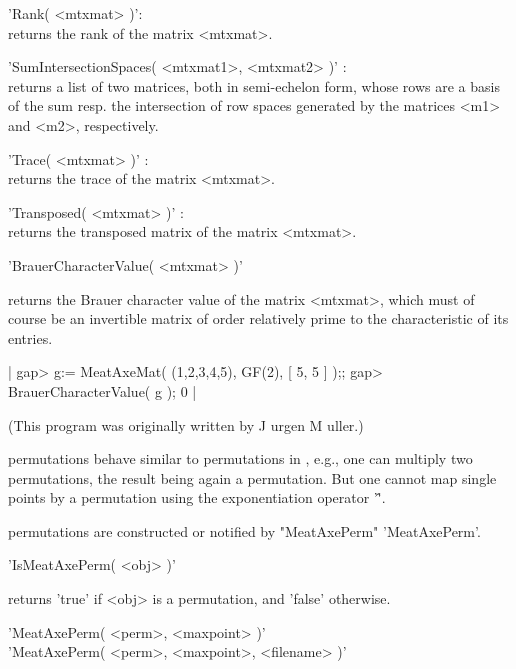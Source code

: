'Rank( <mtxmat> )': \\
     returns the rank of the {\MeatAxe} matrix <mtxmat>.

'SumIntersectionSpaces( <mtxmat1>, <mtxmat2> )' : \\
     returns a list of two {\MeatAxe} matrices, both in semi-echelon form,
     whose rows are a basis of the sum resp. the intersection of row spaces
     generated by the {\MeatAxe} matrices <m1> and <m2>, respectively.

'Trace( <mtxmat> )' : \\
     returns the trace of the {\MeatAxe} matrix <mtxmat>.

'Transposed( <mtxmat> )' : \\
     returns the transposed matrix of the {\MeatAxe} matrix <mtxmat>.


'BrauerCharacterValue( <mtxmat> )'

returns the Brauer character value of the {\MeatAxe} matrix <mtxmat>, which
must of course be an invertible matrix of order relatively prime to the
characteristic of its entries.

|    gap> g:= MeatAxeMat( (1,2,3,4,5), GF(2), [ 5, 5 ] );;
    gap> BrauerCharacterValue( g );
    0 |

(This program was originally written by
J{ u}rgen M{ u}ller.)


{\MeatAxe} permutations behave similar to permutations in {\GAP}, e.g., one
can multiply two {\MeatAxe} permutations, the result being again a {\MeatAxe}
permutation.  But one cannot map single points by a {\MeatAxe} permutation
using the exponentiation operator '\^'.

{\MeatAxe} permutations are constructed or notified by "MeatAxePerm"
'MeatAxePerm'.

\vspace{5mm}

'IsMeatAxePerm( <obj> )'

returns 'true' if <obj> is a {\MeatAxe} permutation, and 'false' otherwise.


'MeatAxePerm( <perm>, <maxpoint> )' \\
'MeatAxePerm( <perm>, <maxpoint>, <filename> )'

